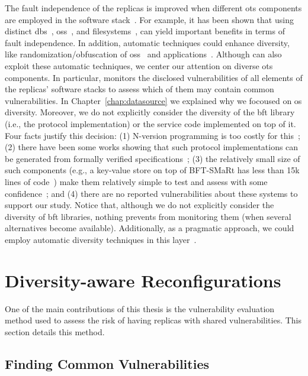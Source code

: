 The fault independence of the replicas is improved when different \gls{ots} components are employed in the software stack~\cite{Deswarte:1998}. 
For example, it has been shown that using distinct \glspl{db}~\cite{Gashi:2007}, \glspl{os}~\cite{Garcia:2013}, and filesystems~\cite{Castro:2003,Bairavasundaram:2009}, can yield important benefits in terms of fault independence. 
In addition, automatic techniques could enhance diversity, like randomization/obfuscation of \glspl{os}~\cite{Roeder:2010} and applications~\cite{King:2016}.
Although \system can also exploit these automatic techniques, we center our attention on diverse \gls{ots} components. 
In particular, \system monitors the disclosed vulnerabilities of all elements of the replicas' software stacks to assess which of them may contain common vulnerabilities.  
In Chapter~\ref{chap:datasource} we explained why we focoused on \gls{os} diversity. 
Moreover, we do not explicitly consider the diversity of the \gls{bft} library (i.e., the protocol implementation) or the service code implemented on top of it.
Four facts justify this decision: (1) N-version programming is too costly for this~\cite{Avizienis:1977}; (2) there have been some works showing that such protocol implementations can be generated from formally verified specifications~\cite{Hawblitzel:2015,Rahli:2018}; (3) the relatively small size of such components (e.g., a key-value store on top of BFT-SMaRt has less than 15k lines of code~\cite{Bessani:2014}) make them relatively simple to test and assess with some confidence~\cite{Martins:2013,Lee:2014}; and (4) there are no reported vulnerabilities about these systems to support our study.
Notice that, although we do not explicitly consider the diversity of \gls{bft} libraries, nothing prevents \system from monitoring them (when several alternatives become available). 
Additionally, as a pragmatic approach, we could employ automatic diversity techniques in this layer~\cite{Platania:2014,Roeder:2010}.


\section{Diversity-aware Reconfigurations}
\label{sec:metric}

One of the main contributions of this thesis is the vulnerability evaluation method used to assess the risk of having replicas with shared vulnerabilities.
This section details this method.

\subsection{Finding Common Vulnerabilities}
\label{sec:common_vulnerabilities}

